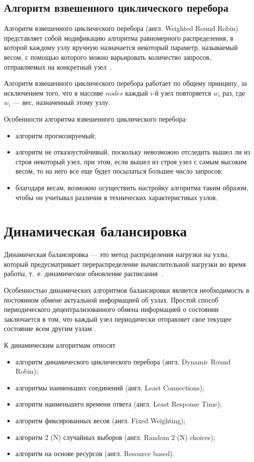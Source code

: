 \subsection*{Алгоритм взвешенного циклического перебора}

Алгоритм взвешенного циклического перебора (англ. Weighted Round Robin) представляет собой модификацию алгоритма равномерного распределения, в которой каждому узлу вручную назначается некоторый параметр, называемый весом, с помощью которого можно варьировать количество запросов, отправляемых на конкретный узел~\cite{part_algos}.

Алгоритм взвешенного циклического перебора работает по общему принципу, за исключением того, что в массиве $nodes$ каждый $i$-й узел повторяется $w_i$ раз, где $w_i$ --- вес, назначенный этому узлу.

Особенности алгоритма взвешенного циклического перебора:
\begin{itemize}
	\item алгоритм прогнозируемый;
	\item алгоритм не отказоустойчивый, поскольку невозможно отследить вышел ли из строя некоторый узел, при этом, если вышел из строя узел с самым высоким весом, то на него все еще будет посылаться большее число запросов;
	\item благодаря весам, возможно осуществить настройку алгоритма таким образом, чтобы он учитывал различия в технических характеристиках узлов.
\end{itemize}


\section{Динамическая балансировка}

Динамическая балансировка --- это метод распределения нагрузки на узлы, который предусматривает перераспределение вычислительной нагрузки во время работы, т.~е. динамическое обновление расписания~\cite{intuit}.
 

Особенностью динамических алгоритмов балансировки является необходимость в постоянном обмене актуальной информацией об узлах.
Простой способ периодического децентрализованного обмена информацией о состоянии заключается в том, что каждый узел периодически отправляет свое текущее состояние всем другим узлам \cite{drr}.

К динамическим алгоритмам относят~\cite{drr, dll_warsh, mainsource}
\begin{itemize}
	\item алгоритм динамического циклического перебора (англ. Dynamic Round Robin);
	\item алгоритмы наименьших соединений (англ. Least Connections);
	\item алгоритм наименьшего времени ответа (англ. Least Response Time);
    \item алгоритм фиксированных весов (англ. Fixed Weighting);
	\item алгоритм 2 (N) случайных выборов (англ. Random 2 (N) choices);
	\item алгоритм на основе ресурсов (англ. Resource based).
\end{itemize}


